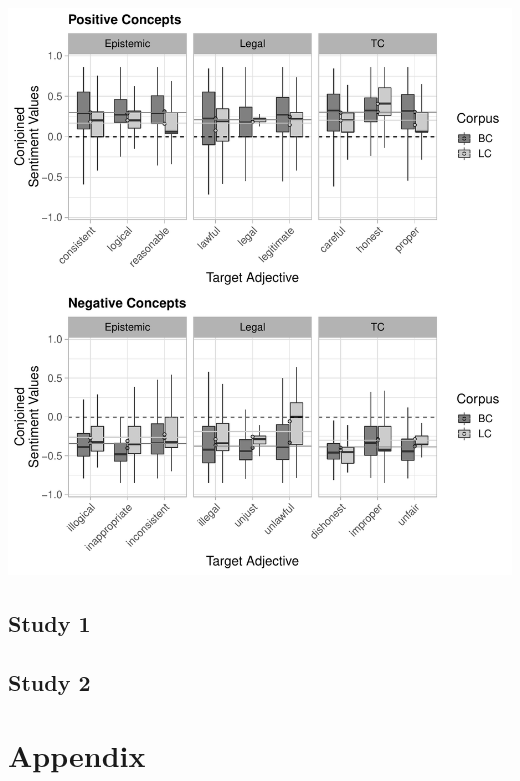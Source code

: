 \documentclass{article}
\begin{document}
\includegraphics[width=\textwidth, keepaspectratio]{bc_lc_summary_stats_adj-distr}

\subsection{Study 1}


\subsection{Study 2}




\section{Appendix}
\label{sec:appendix}
\end{document}
